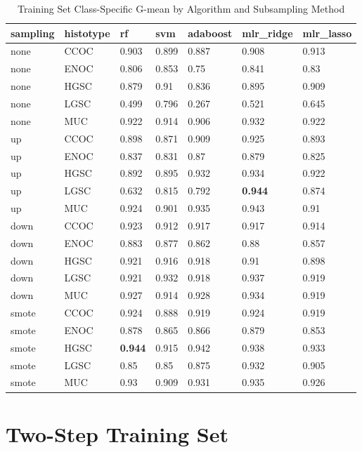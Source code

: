 \documentclass[
]{report}
\begin{document}
\begin{table}

\caption{\label{tab:train-gmean-class-table}Training Set Class-Specific G-mean by Algorithm and Subsampling Method}
\centering
\begin{tabular}[t]{l|l|l|l|l|l|l}
\hline
sampling & histotype & rf & svm & adaboost & mlr\_ridge & mlr\_lasso\\
\hline
none & CCOC & 0.903 & 0.899 & 0.887 & 0.908 & 0.913\\
\hline
none & ENOC & 0.806 & 0.853 & 0.75 & 0.841 & 0.83\\
\hline
none & HGSC & 0.879 & 0.91 & 0.836 & 0.895 & 0.909\\
\hline
none & LGSC & 0.499 & 0.796 & 0.267 & 0.521 & 0.645\\
\hline
none & MUC & 0.922 & 0.914 & 0.906 & 0.932 & 0.922\\
\hline
up & CCOC & 0.898 & 0.871 & 0.909 & 0.925 & 0.893\\
\hline
up & ENOC & 0.837 & 0.831 & 0.87 & 0.879 & 0.825\\
\hline
up & HGSC & 0.892 & 0.895 & 0.932 & 0.934 & 0.922\\
\hline
up & LGSC & 0.632 & 0.815 & 0.792 & \textbf{0.944} & 0.874\\
\hline
up & MUC & 0.924 & 0.901 & 0.935 & 0.943 & 0.91\\
\hline
down & CCOC & 0.923 & 0.912 & 0.917 & 0.917 & 0.914\\
\hline
down & ENOC & 0.883 & 0.877 & 0.862 & 0.88 & 0.857\\
\hline
down & HGSC & 0.921 & 0.916 & 0.918 & 0.91 & 0.898\\
\hline
down & LGSC & 0.921 & 0.932 & 0.918 & 0.937 & 0.919\\
\hline
down & MUC & 0.927 & 0.914 & 0.928 & 0.934 & 0.919\\
\hline
smote & CCOC & 0.924 & 0.888 & 0.919 & 0.924 & 0.919\\
\hline
smote & ENOC & 0.878 & 0.865 & 0.866 & 0.879 & 0.853\\
\hline
smote & HGSC & \textbf{0.944} & 0.915 & 0.942 & 0.938 & 0.933\\
\hline
smote & LGSC & 0.85 & 0.85 & 0.875 & 0.932 & 0.905\\
\hline
smote & MUC & 0.93 & 0.909 & 0.931 & 0.935 & 0.926\\
\hline
\end{tabular}
\end{table}

\hypertarget{two-step-training-set}{%
\section{Two-Step Training Set}\label{two-step-training-set}}
\end{document}
